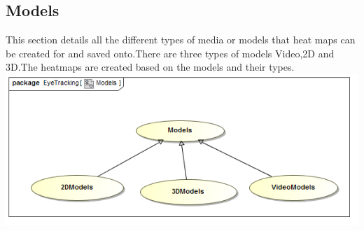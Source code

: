 \subsection{Models}
This section details all the different types of media or models that heat maps can be created for and saved onto.There are three types of models Video,2D and 3D.The heatmaps are created based on the models and their types.
\newline
	\includegraphics[scale=0.5]{Diagrams/Use_Case_Diagram__Models.png}
	
	
